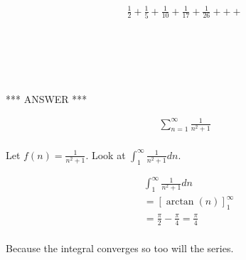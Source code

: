 \documentclass[fleqn]{article}
\begin{document}
\begin{align*}
\frac{1}{2} + \frac{1}{5} + \frac{1}{10} + \frac{1}{17} + \frac{1}{26} + + +\\
\end{align*}

\begin{verbatim}





\end{verbatim}

*** ANSWER ***

\begin{align*}
\sum_{n=1}^{\infty} \frac{1}{n^2+1}\\
\end{align*}

Let $f(n) = \frac{1}{n^2+1}$.
Look at $\int_{1}^{\infty} \frac{1}{n^2+1} dn$.

\begin{align*}
& \int_{1}^{\infty} \frac{1}{n^2+1} dn\\
&= \left[ \arctan(n) \right]_{1}^{\infty}\\
&= \frac{\pi}{2} - \frac{\pi}{4} = \frac{\pi}{4}\\
\end{align*}

Because the integral converges so too will the series.
\end{document}
